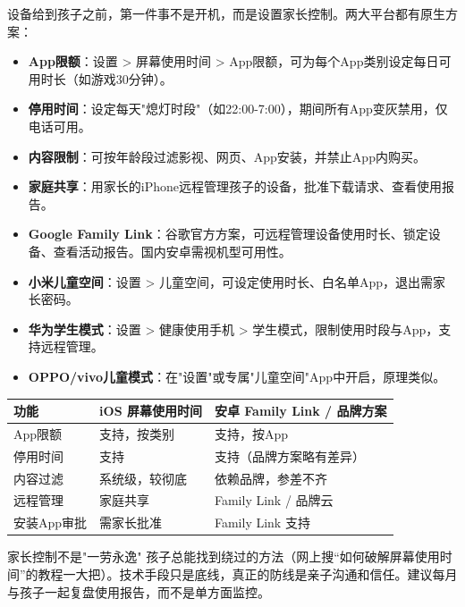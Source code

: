 
设备给到孩子之前，第一件事不是开机，而是设置家长控制。两大平台都有原生方案：


\begin{itemize}
  \item \textbf{App限额}：设置 > 屏幕使用时间 > App限额，可为每个App类别设定每日可用时长（如游戏30分钟）。
  \item \textbf{停用时间}：设定每天"熄灯时段"（如22:00-7:00），期间所有App变灰禁用，仅电话可用。
  \item \textbf{内容限制}：可按年龄段过滤影视、网页、App安装，并禁止App内购买。
  \item \textbf{家庭共享}：用家长的iPhone远程管理孩子的设备，批准下载请求、查看使用报告。
\end{itemize}


\begin{itemize}
  \item \textbf{Google Family Link}：谷歌官方方案，可远程管理设备使用时长、锁定设备、查看活动报告。国内安卓需视机型可用性。
  \item \textbf{小米儿童空间}：设置 > 儿童空间，可设定使用时长、白名单App，退出需家长密码。
  \item \textbf{华为学生模式}：设置 > 健康使用手机 > 学生模式，限制使用时段与App，支持远程管理。
  \item \textbf{OPPO/vivo儿童模式}：在"设置"或专属"儿童空间"App中开启，原理类似。
\end{itemize}

\begin{center}
\begin{tabularx}{\linewidth}{|X|X|X|}
\hline
\textbf{功能} & \textbf{iOS 屏幕使用时间} & \textbf{安卓 Family Link / 品牌方案} \tabularnewline
\hline
App限额 & 支持，按类别 & 支持，按App \tabularnewline
停用时间 & 支持 & 支持（品牌方案略有差异） \tabularnewline
内容过滤 & 系统级，较彻底 & 依赖品牌，参差不齐 \tabularnewline
远程管理 & 家庭共享 & Family Link / 品牌云 \tabularnewline
安装App审批 & 需家长批准 & Family Link 支持 \tabularnewline
\hline
\end{tabularx}
\end{center}

\begin{tcbwarn}{家长控制不是"一劳永逸"}
孩子总能找到绕过的方法（网上搜“如何破解屏幕使用时间”的教程一大把）。技术手段只是底线，真正的防线是亲子沟通和信任。建议每月与孩子一起复盘使用报告，而不是单方面监控。

\end{tcbwarn}

